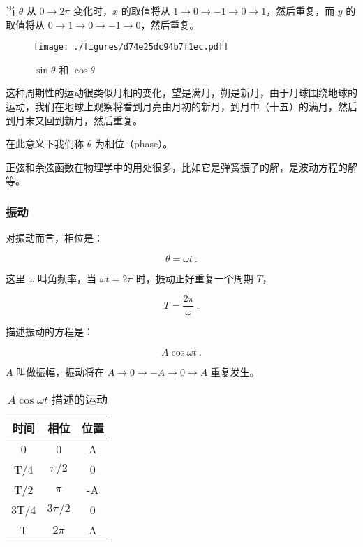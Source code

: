 当 $\theta$ 从 $0 \to 2\pi$ 变化时，$x$ 的取值将从 $1 \to 0 \to -1 \to 0 \to 1$，然后重复，而 $y$ 的取值将从 $0 \to 1 \to 0 \to -1 \to 0$，然后重复。

\begin{figure}[ht]
\centering
\texttt{[image: ./figures/d74e25dc94b7f1ec.pdf]}
\caption{$\sin\theta$ 和 $\cos\theta$} \label{fig_AtomId_7}
\end{figure}


这种周期性的运动很类似月相的变化，望是满月，朔是新月，由于月球围绕地球的运动，我们在地球上观察将看到月亮由月初的新月，到月中（十五）的满月，然后到月末又回到新月，然后重复。

在此意义下我们称 $\theta$ 为相位（phase）。

正弦和余弦函数在物理学中的用处很多，比如它是弹簧振子的解，是波动方程的解等。

\subsubsection{振动}

对振动而言，相位是：

\begin{equation}
\theta = \omega t ~.
\end{equation}

这里 $\omega$ 叫角频率，当 $\omega t = 2 \pi$ 时，振动正好重复一个周期 $T$，

\begin{equation}
T = \frac{2 \pi}{\omega}~.
\end{equation}

描述振动的方程是：

\begin{equation}
A \cos \omega t~.
\end{equation}

$A$ 叫做振幅，振动将在 $A \to 0 \to -A \to 0 \to A$ 重复发生。

\begin{table}[ht]
\centering
\caption{$A \cos \omega t$ 描述的运动}\label{tab_AtomId_3}
\begin{tabular}{|c|c|c|}
\hline
时间 & 相位 &  位置 \\
\hline
0 & 0 & A \\
\hline
T/4 & $\pi /2 $ & 0 \\
\hline
T/2 & $\pi$ & -A \\
\hline
3T/4 & $3 \pi /2  $ &  0 \\
\hline
T &  $2\pi$  & A \\
\hline
\end{tabular}
\end{table}

